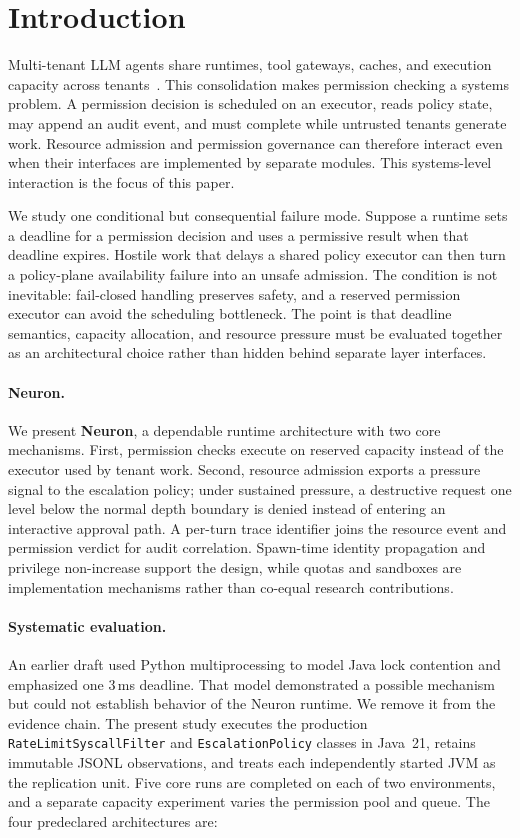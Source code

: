 \section{Introduction}
\label{sec:intro}

Multi-tenant LLM agents share runtimes, tool gateways, caches, and execution
capacity across tenants~\cite{mei2025aios,wu2023autogen}. This consolidation
makes permission checking a systems problem. A permission decision is
scheduled on an executor, reads policy state, may append an audit event, and
must complete while untrusted tenants generate work. Resource admission and
permission governance can therefore interact even when their interfaces are
implemented by separate modules. This systems-level interaction is the focus
of this paper.

We study one conditional but consequential failure mode. Suppose a runtime
sets a deadline for a permission decision and uses a permissive result when
that deadline expires. Hostile work that delays a shared policy executor can
then turn a policy-plane availability failure into an unsafe admission. The
condition is not inevitable: fail-closed handling preserves safety, and a
reserved permission executor can avoid the scheduling bottleneck. The point is
that deadline semantics, capacity allocation, and resource pressure must be
evaluated together as an architectural choice rather than hidden behind
separate layer interfaces.

\paragraph{Neuron.}
We present \textbf{Neuron}, a dependable runtime architecture with two core
mechanisms. First, permission checks execute on reserved capacity instead of
the executor used by tenant work. Second, resource admission exports a
pressure signal to the escalation policy; under sustained pressure, a
destructive request one level below the normal depth boundary is denied
instead of entering an interactive approval path. A per-turn trace identifier
joins the resource event and permission verdict for audit correlation.
Spawn-time identity propagation and privilege non-increase support the design,
while quotas and sandboxes are implementation mechanisms rather than
co-equal research contributions.

\paragraph{Systematic evaluation.}
An earlier draft used Python multiprocessing to model Java lock contention and
emphasized one 3\,ms deadline. That model demonstrated a possible mechanism
but could not establish behavior of the Neuron runtime. We remove it from the
evidence chain. The present study executes the production
\texttt{RateLimitSyscallFilter} and \texttt{EscalationPolicy} classes in
Java~21, retains immutable JSONL observations, and treats each independently
started JVM as the replication unit. Five core runs are completed on each of
two environments, and a separate capacity experiment varies the permission
pool and queue. The four predeclared architectures are:

